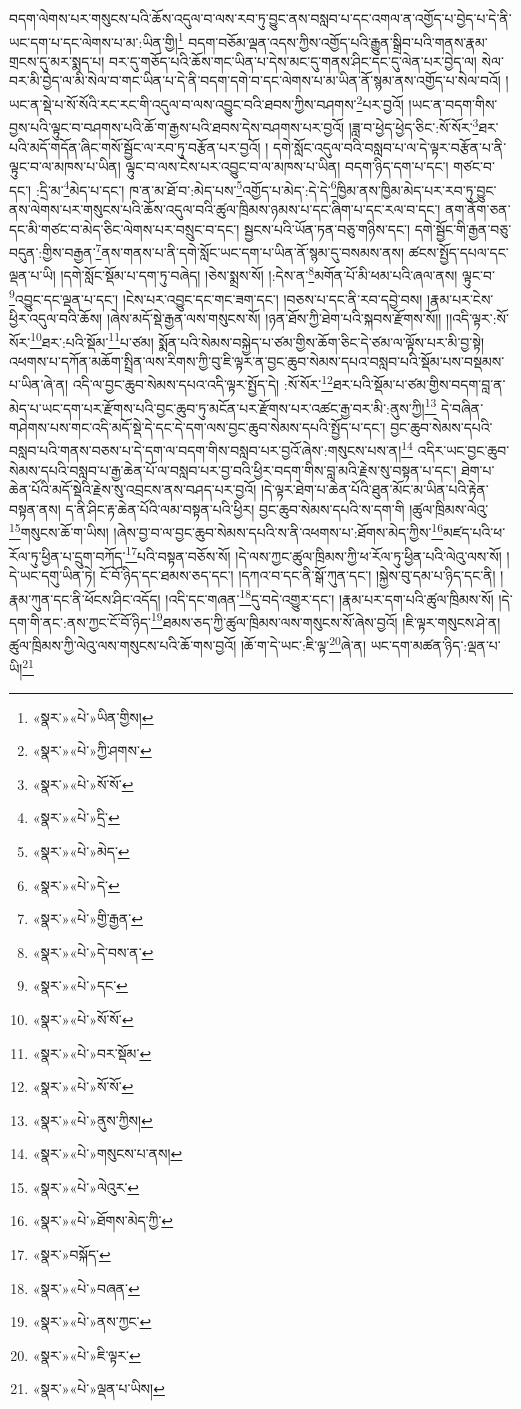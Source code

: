 བདག་ལེགས་པར་གསུངས་པའི་ཆོས་འདུལ་བ་ལས་རབ་ཏུ་བྱུང་ནས་བསླབ་པ་དང་འགལ་ན་འགྱོད་པ་བྱེད་པ་དེ་ནི་ཡང་དག་པ་དང་ལེགས་པ་མ་:ཡིན་གྱི།\footnote{«སྣར་»«པེ་»ཡིན་གྱིས།} བདག་བཅོམ་ལྡན་འདས་ཀྱིས་འགྱོད་པའི་རྒྱུན་སྒྲིབ་པའི་གནས་རྣམ་གྲངས་དུ་མར་སྨད་པ། བར་དུ་གཅོད་པའི་ཆོས་གང་ཡིན་པ་དེས་མང་དུ་གནས་ཤིང་དང་དུ་ལེན་པར་བྱེད་ལ། སེལ་བར་མི་བྱེད་ལ་མི་སེལ་བ་གང་ཡིན་པ་དེ་ནི་བདག་དགེ་བ་དང་ལེགས་པ་མ་ཡིན་ནོ་སྙམ་ནས་འགྱོད་པ་སེལ་བའོ། །ཡང་ན་སྡེ་པ་སོ་སོའི་རང་རང་གི་འདུལ་བ་ལས་འབྱུང་བའི་ཐབས་ཀྱིས་བཤགས་\footnote{«སྣར་»«པེ་»ཀྱི་ཤགས་}པར་བྱའོ། །ཡང་ན་བདག་གིས་བྱས་པའི་ལྟུང་བ་བཤགས་པའི་ཆོ་ག་རྒྱས་པའི་ཐབས་དེས་བཤགས་པར་བྱའོ། །ཟླ་བ་ཕྱེད་ཕྱེད་ཅིང་:སོ་སོར་\footnote{«སྣར་»«པེ་»སོ་སོ་}ཐར་པའི་མདོ་གདོན་ཞིང་གསོ་སྦྱོང་ལ་རབ་ཏུ་བརྩོན་པར་བྱའོ། །
དགེ་སློང་འདུལ་བའི་བསླབ་པ་ལ་དེ་ལྟར་བརྩོན་པ་ནི་ལྟུང་བ་ལ་མཁས་པ་ཡིན། ལྟུང་བ་ལས་ངེས་པར་འབྱུང་བ་ལ་མཁས་པ་ཡིན། བདག་ཉིད་དག་པ་དང་། གཙང་བ་དང་། :དྲི་མ་\footnote{«སྣར་»«པེ་»དྲི་}མེད་པ་དང་། ཁ་ན་མ་ཐོ་བ་:མེད་པས་\footnote{«སྣར་»«པེ་»མེད་}འགྱོད་པ་མེད་:དེ་དེ་\footnote{«སྣར་»«པེ་»དེ་}ཁྱིམ་ནས་ཁྱིམ་མེད་པར་རབ་ཏུ་བྱུང་ནས་ལེགས་པར་གསུངས་པའི་ཆོས་འདུལ་བའི་ཚུལ་ཁྲིམས་ཉམས་པ་དང་ཞིག་པ་དང་རལ་བ་དང་། ནག་ནོག་ཅན་དང་མི་གཙང་བ་མེད་ཅིང་ལེགས་པར་བསྲུང་བ་དང་། སྦྱངས་པའི་ཡོན་ཏན་བཅུ་གཉིས་དང་། དགེ་སྦྱོང་གི་རྒྱན་བཅུ་བདུན་:གྱིས་བརྒྱན་\footnote{«སྣར་»«པེ་»གྱི་རྒྱན་}ནས་གནས་པ་ནི་དགེ་སློང་ཡང་དག་པ་ཡིན་ནོ་སྙམ་དུ་བསམས་ནས། ཚངས་སྤྱོད་དཔལ་དང་ལྡན་པ་ཡི། །དགེ་སློང་སྡོམ་པ་དག་ཏུ་བཞེད། །ཅེས་སྨྲས་སོ། །:དེས་ན་\footnote{«སྣར་»«པེ་»དེ་བས་ན་}མགོན་པོ་མི་ཕམ་པའི་ཞལ་ནས། ལྟུང་བ་\footnote{«སྣར་»«པེ་»དང་}འབྱུང་དང་ལྡན་པ་དང་། །ངེས་པར་འབྱུང་དང་གང་ཟག་དང་། །བཅས་པ་དང་ནི་རབ་དབྱེ་བས། །རྣམ་པར་ངེས་ཕྱིར་འདུལ་བའི་ཆོས། །ཞེས་མདོ་སྡེ་རྒྱན་ལས་གསུངས་སོ། །ཉན་ཐོས་ཀྱི་ཐེག་པའི་སྐབས་རྫོགས་སོ།། །།འདི་ལྟར་:སོ་སོར་\footnote{«སྣར་»«པེ་»སོ་སོ་}ཐར་:པའི་སྡོམ་\footnote{«སྣར་»«པེ་»བར་སྡོམ་}པ་ཙམ། སྨོན་པའི་སེམས་བསྐྱེད་པ་ཙམ་གྱིས་ཆོག་ཅིང་དེ་ཙམ་ལ་ལྟོས་པར་མི་བྱ་སྟེ། འཕགས་པ་དཀོན་མཆོག་སྤྲིན་ལས་རིགས་ཀྱི་བུ་ཇི་ལྟར་ན་བྱང་ཆུབ་སེམས་དཔའ་བསླབ་པའི་སྡོམ་པས་བསྡམས་པ་ཡིན་ཞེ་ན། འདི་ལ་བྱང་ཆུབ་སེམས་དཔའ་འདི་ལྟར་སྤྱོད་དེ། :སོ་སོར་\footnote{«སྣར་»«པེ་»སོ་སོ་}ཐར་པའི་སྡོམ་པ་ཙམ་གྱིས་བདག་བླ་ན་མེད་པ་ཡང་དག་པར་རྫོགས་པའི་བྱང་ཆུབ་ཏུ་མངོན་པར་རྫོགས་པར་འཚང་རྒྱ་བར་མི་:ནུས་ཀྱི།\footnote{«སྣར་»«པེ་»ནུས་ཀྱིས།} དེ་བཞིན་གཤེགས་པས་གང་འདི་མདོ་སྡེ་དེ་དང་དེ་དག་ལས་བྱང་ཆུབ་སེམས་དཔའི་སྤྱོད་པ་དང་། བྱང་ཆུབ་སེམས་དཔའི་བསླབ་པའི་གནས་བཅས་པ་དེ་དག་ལ་བདག་གིས་བསླབ་པར་བྱའོ་ཞེས་:གསུངས་པས་ན།\footnote{«སྣར་»«པེ་»གསུངས་པ་ནས།} འདིར་ཡང་བྱང་ཆུབ་སེམས་དཔའི་བསླབ་པ་རྒྱ་ཆེན་པོ་ལ་བསླབ་པར་བྱ་བའི་ཕྱིར་བདག་གིས་བླ་མའི་རྗེས་སུ་བསྟན་པ་དང་། ཐེག་པ་ཆེན་པོའི་མདོ་སྡེའི་རྗེས་སུ་འབྲངས་ནས་བཤད་པར་བྱའོ། །དེ་ལྟར་ཐེག་པ་ཆེན་པོའི་ཐུན་མོང་མ་ཡིན་པའི་རྟེན་བསྟན་ནས། ད་ནི་ཤིང་རྟ་ཆེན་པོའི་ལམ་བསྟན་པའི་ཕྱིར། བྱང་ཆུབ་སེམས་དཔའི་ས་དག་གི །ཚུལ་ཁྲིམས་ལེའུ་\footnote{«སྣར་»«པེ་»ལེའུར་}གསུངས་ཆོ་ག་ཡིས། །ཞེས་བྱ་བ་ལ་བྱང་ཆུབ་སེམས་དཔའི་ས་ནི་འཕགས་པ་:ཐོགས་མེད་ཀྱིས་\footnote{«སྣར་»«པེ་»ཐོགས་མེད་ཀྱི་}མཛད་པའི་ཕ་རོལ་ཏུ་ཕྱིན་པ་དྲུག་བཀོད་\footnote{«སྣར་»བསྐོད་}པའི་བསྟན་བཅོས་སོ། །དེ་ལས་ཀྱང་ཚུལ་ཁྲིམས་ཀྱི་ཕ་རོལ་ཏུ་ཕྱིན་པའི་ལེའུ་ལས་སོ། །དེ་ཡང་དགུ་ཡིན་ཏེ། ངོ་བོ་ཉིད་དང་ཐམས་ཅད་དང་། །དཀའ་བ་དང་ནི་སྒོ་ཀུན་དང་། །སྐྱེས་བུ་དམ་པ་ཉིད་དང་ནི། །རྣམ་ཀུན་དང་ནི་ཕོངས་ཤིང་འདོད། །འདི་དང་གཞན་\footnote{«སྣར་»«པེ་»བཞན་}དུ་བདེ་འགྱུར་དང་། །རྣམ་པར་དག་པའི་ཚུལ་ཁྲིམས་སོ། །དེ་དག་གི་ནང་:ནས་ཀྱང་ངོ་བོ་ཉིད་\footnote{«སྣར་»«པེ་»ནས་ཀྱང་}ཐམས་ཅད་ཀྱི་ཚུལ་ཁྲིམས་ལས་གསུངས་སོ་ཞེས་བྱའོ། །ཇི་ལྟར་གསུངས་ཤེ་ན། ཚུལ་ཁྲིམས་ཀྱི་ལེའུ་ལས་གསུངས་པའི་ཆོ་གས་བྱའོ། །ཆོ་ག་དེ་ཡང་:ཇི་ལྟ་\footnote{«སྣར་»«པེ་»ཇི་ལྟར་}ཞེ་ན། ཡང་དག་མཚན་ཉིད་:ལྡན་པ་ཡི།\footnote{«སྣར་»«པེ་»ལྡན་པ་ཡིས།} 